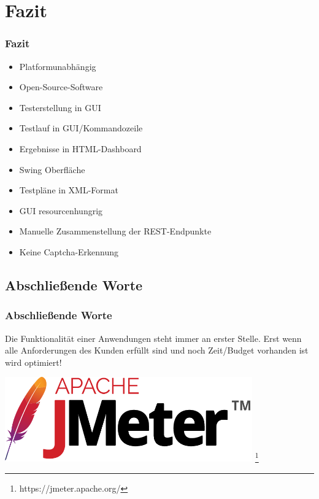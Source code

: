 \documentclass[xcolor=dvipsnames]{beamer}
\newcommand{\pro}{\item[\boldmath${\color{green}+}$ ]}
\newcommand{\con}{\item[\boldmath$ {\color{red}-}$ ]}
\newcommand{\neutral}{\item[\boldmath$ {\color{black}\bullet}$ ]}
\begin{document}
 

\section{Fazit}	
\begin{frame}
	\frametitle{Fazit}
	\begin{itemize}
		\pro Platformunabhängig
		\pro Open-Source-Software
		\pro Testerstellung in GUI
		\pro Testlauf in GUI/Kommandozeile
		\pro Ergebnisse in HTML-Dashboard
		
		\con Swing Oberfläche
		\con Testpläne in XML-Format
		\con GUI resourcenhungrig
		
		\neutral Manuelle Zusammenstellung der REST-Endpunkte
		\neutral Keine Captcha-Erkennung
		
	\end{itemize}
\end{frame}

\subsection{Abschließende Worte}
\begin{frame}
\frametitle{Abschließende Worte}
Die Funktionalität einer Anwendungen steht immer an erster Stelle. Erst wenn alle Anforderungen des Kunden erfüllt sind und noch Zeit/Budget vorhanden ist wird optimiert! 
\end{frame}

\begin{frame}
\begin{center}\includegraphics[width=0.8\textwidth]{bilder/apache_logo}
\footnote{\tiny https://jmeter.apache.org/}
\end{center}
\end{frame}
\end{document}
